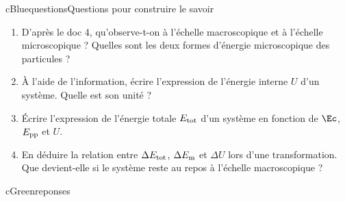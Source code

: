 \begin{rub}{cBlue}{questions}{Questions pour construire le savoir}
\begin{enumerate}
  \item {} D’après le doc 4, qu’observe-t-on à l’échelle macroscopique et à l’échelle microscopique ? Quelles sont les deux formes d’énergie microscopique des particules ?
  \item {} À l’aide de l’information, écrire l’expression de l’énergie interne $U$ d’un système. Quelle est son unité ?
  \item {} Écrire l’expression de l’énergie totale $E_{\mathrm{tot}}$ d’un système en fonction de $\Ec$, $E_{\mathrm{pp}}$ et $U$.
  \item {} En déduire la relation entre $\Delta E_{\mathrm{tot}}$, $\Delta E_{\mathrm{m}}$ et $\Delta U$ lors d’une transformation. Que devient-elle si le système reste au repos à l’échelle macroscopique ?
\end{enumerate}
\end{rub}

\begin{rub}{cGreen}{reponses}{\titrereponses}
\begin{reps}
  \item {}
  \item {}
  \item {}
  \item {}
\end{reps}
\end{rub}

